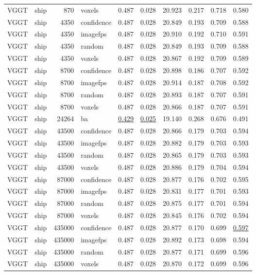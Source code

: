 \begin{table}[H]
\begin{tabular}{llrlrrrrrr}
VGGT & ship & 870 & voxels & 0.487 & 0.028 & 20.923 & 0.217 & 0.718 & 0.580 \\
VGGT & ship & 4350 & confidence & 0.487 & 0.028 & 20.849 & 0.193 & 0.709 & 0.588 \\
VGGT & ship & 4350 & imagefps & 0.487 & 0.028 & 20.910 & 0.192 & 0.710 & 0.591 \\
VGGT & ship & 4350 & random & 0.487 & 0.028 & 20.849 & 0.193 & 0.709 & 0.588 \\
VGGT & ship & 4350 & voxels & 0.487 & 0.028 & 20.867 & 0.192 & 0.709 & 0.589 \\
VGGT & ship & 8700 & confidence & 0.487 & 0.028 & 20.898 & 0.186 & 0.707 & 0.592 \\
VGGT & ship & 8700 & imagefps & 0.487 & 0.028 & 20.914 & 0.187 & 0.708 & 0.592 \\
VGGT & ship & 8700 & random & 0.487 & 0.028 & 20.893 & 0.187 & 0.707 & 0.591 \\
VGGT & ship & 8700 & voxels & 0.487 & 0.028 & 20.866 & 0.187 & 0.707 & 0.591 \\
VGGT & ship & 24264 & ba & \underline{0.429} & \underline{0.025} & 19.140 & 0.268 & 0.676 & 0.491 \\
VGGT & ship & 43500 & confidence & 0.487 & 0.028 & 20.866 & 0.179 & 0.703 & 0.594 \\
VGGT & ship & 43500 & imagefps & 0.487 & 0.028 & 20.882 & 0.179 & 0.703 & 0.593 \\
VGGT & ship & 43500 & random & 0.487 & 0.028 & 20.865 & 0.179 & 0.703 & 0.593 \\
VGGT & ship & 43500 & voxels & 0.487 & 0.028 & 20.886 & 0.179 & 0.704 & 0.594 \\
VGGT & ship & 87000 & confidence & 0.487 & 0.028 & 20.877 & 0.176 & 0.702 & 0.595 \\
VGGT & ship & 87000 & imagefps & 0.487 & 0.028 & 20.831 & 0.177 & 0.701 & 0.593 \\
VGGT & ship & 87000 & random & 0.487 & 0.028 & 20.875 & 0.177 & 0.701 & 0.594 \\
VGGT & ship & 87000 & voxels & 0.487 & 0.028 & 20.845 & 0.176 & 0.702 & 0.594 \\
VGGT & ship & 435000 & confidence & 0.487 & 0.028 & 20.877 & 0.170 & 0.699 & \underline{0.597} \\
VGGT & ship & 435000 & imagefps & 0.487 & 0.028 & 20.892 & 0.173 & 0.698 & 0.594 \\
VGGT & ship & 435000 & random & 0.487 & 0.028 & 20.877 & 0.171 & 0.699 & 0.596 \\
VGGT & ship & 435000 & voxels & 0.487 & 0.028 & 20.870 & 0.172 & 0.699 & 0.596 \\

\end{tabular}
\end{table}
